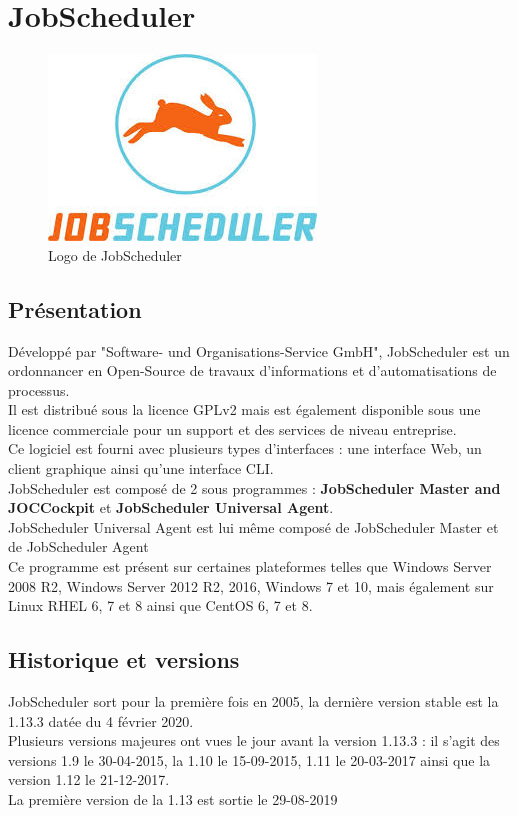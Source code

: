 \documentclass[12pt]{article}
\begin{document}
\section{JobScheduler}

\begin{figure}[ht]
    \centering
    \includegraphics[scale=0.6]{images/jobscheduler.jpg}
    \caption{Logo de JobScheduler}
\end{figure}

\subsection{Présentation}
Développé par "Software- und Organisations-Service GmbH", JobScheduler est un ordonnancer en Open-Source de travaux d'informations et d'automatisations de processus.
\\
Il est distribué sous la licence GPLv2 mais est également disponible sous une licence commerciale pour un support et des services de niveau entreprise.
\\
Ce logiciel est fourni avec plusieurs types d'interfaces : une interface Web, un client graphique ainsi qu'une interface CLI.
\\
JobScheduler est composé de 2 sous programmes : \textbf{JobScheduler Master and JOC\footnotemark[1] Cockpit} et \textbf{JobScheduler Universal Agent}.
\\
JobScheduler Universal Agent est lui même composé de JobScheduler Master et de JobScheduler Agent
\\
Ce programme est présent sur certaines plateformes telles que Windows Server 2008 R2, Windows Server 2012 R2, 2016, Windows 7 et 10, mais également sur Linux RHEL  6, 7 et 8 ainsi que CentOS  6, 7 et 8.


\subsection{Historique et versions}
JobScheduler sort pour la première fois en 2005, la dernière version stable est la 1.13.3 datée du 4 février 2020.
\\
Plusieurs versions majeures ont vues le jour avant la version 1.13.3 : il s'agit des versions 1.9 le 30-04-2015, la 1.10 le 15-09-2015, 1.11 le 20-03-2017 ainsi que la version 1.12 le 21-12-2017.
\\
La première version de la 1.13 est sortie le 29-08-2019
\end{document}
